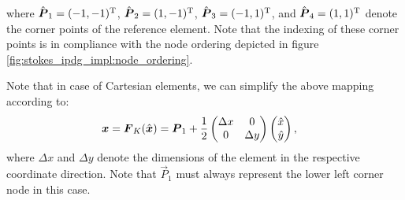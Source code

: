 \documentclass{scrreprt}
\begin{document}
where $\hat{{\boldsymbol P}}_1=(-1,-1)^\textrm{T}$, $\hat{{\boldsymbol P}}_2=(1,-1)^\textrm{T}$, $\hat{{\boldsymbol P}}_3=(-1,1)^\textrm{T}$, and $\hat{{\boldsymbol P}}_4=(1,1)^\textrm{T}$ denote the
corner points of the reference element. Note that the indexing of these corner points is in compliance with the node ordering depicted in
figure \ref{fig:stokes_ipdg_impl:node_ordering}.

Note that in case of Cartesian elements, we can simplify the above
mapping according to:
\begin{align}
{\boldsymbol x} = {\boldsymbol F}_{K}(\hat{{\boldsymbol x}}) 
&= 
{\boldsymbol P}_{1} + 
\frac{1}{2}
\begin{pmatrix}
\Delta x & 0 \\
0 & \Delta y
\end{pmatrix}
\begin{pmatrix}
\hat{x} \\
\hat{y}
\end{pmatrix},
\end{align}
where $\Delta x$ and $\Delta y$ denote the dimensions of the element in the
respective coordinate direction.
Note that $\vec{P}_1$ must always represent the lower left corner node in this
case.
\end{document}
